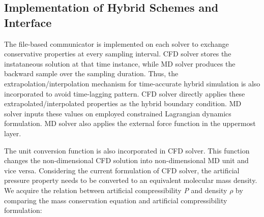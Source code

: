 \documentclass[]{aiaa-tc}%
\begin{document}




\subsection{Implementation of Hybrid Schemes and Interface}
\label{sec:numerics_hybrid}


The file-based communicator is implemented on each solver to exchange conservative
properties at every sampling interval. CFD solver stores the instataneous solution
at that time instance, while MD solver produces the backward sample over the
sampling duration. Thus, the extrapolation/interpolation mechanism for time-accurate
hybrid simulation\cite{JoCS2012} is also incorporated to avoid time-lagging pattern. 
CFD solver directly applies these extrapolated/interpolated properties as the 
hybrid boundary condition. MD solver inputs these values on employed constrained 
Lagrangian dynamics formulation. MD solver also applies the external force function
in the uppermost layer.

The unit conversion function is also incorporated in CFD solver. This function changes
the non-dimensional CFD solution into non-dimensional MD unit and vice versa. 
Considering the current formulation of CFD solver, the artificial pressure property
needs to be converted to an equivalent molecular mass density. We acquire the relation
between artificial compressibility {\it{P}} and density $\rho$ by comparing 
the mass conservation equation and artificial compressibility formulation:
\end{document}
